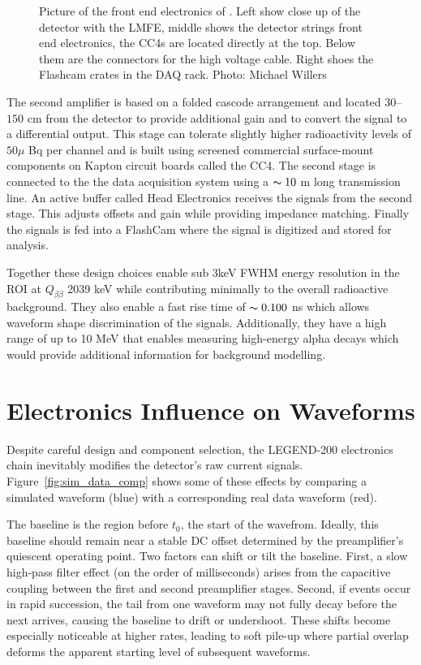 \begin{figure}[!htb]
    \caption{Picture of the front end electronics of {\Ltwo}. Left show close up of the detector with the LMFE, middle shows the detector strings front end electronics, the CC4s are located directly at the top. Below them are the connectors for the high voltage cable. Right shoes the Flashcam crates in the DAQ rack. Photo: Michael Willers}
   \label{fig:l200_elec}
\end{figure}


The second amplifier is based on a folded cascode arrangement and located $30$–$150$ cm from the detector to provide additional gain and to convert the signal to a differential output. This stage can tolerate slightly higher radioactivity levels of $50\mu$ Bq per channel and is built using screened commercial surface-mount components on Kapton circuit boards called the CC4. The second stage is connected to the the data acquisition system using a $\thicksim 10$ m long transmission line. An active buffer called Head Electronics receives the signals from the second stage. This adjusts offsets and gain while providing impedance matching. Finally the signals is fed into a FlashCam where the signal is digitized and stored for analysis.

Together these design choices enable sub 3keV FWHM energy resolution in the ROI at $Q_{\beta\beta}$ 2039 keV while contributing minimally to the overall radioactive background. They also enable a fast rise time of $\thicksim 0.100$ ns which allows waveform shape discrimination of the signals. Additionally, they have a high range of up to 10 MeV that enables measuring high-energy alpha decays which would provide additional information for background modelling.

\section{Electronics Influence on Waveforms}

Despite careful design and component selection, the LEGEND-200 electronics chain inevitably modifies the detector’s raw current signals. Figure~\ref{fig:sim_data_comp} shows some of these effects by comparing a simulated waveform (blue) with a corresponding real data waveform (red).

The baseline is the region before $t_0$, the start of the wavefrom. Ideally, this baseline should remain near a stable DC offset determined by the preamplifier’s quiescent operating point. Two factors can shift or tilt the baseline. First, a slow high-pass filter effect (on the order of milliseconds) arises from the capacitive coupling between the first and second preamplifier stages. Second, if events occur in rapid succession, the tail from one waveform may not fully decay before the next arrives, causing the baseline to drift or undershoot. These shifts become especially noticeable at higher rates, leading to soft pile-up where partial overlap deforms the apparent starting level of subsequent waveforms. 

